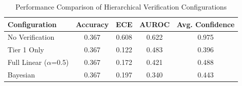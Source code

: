 \begin{table}[h]
\centering
\caption{Performance Comparison of Hierarchical Verification Configurations}
\label{tab:paper1_results}
\begin{tabular}{lcccc}
\hline
Configuration & Accuracy & ECE & AUROC & Avg. Confidence \\
\hline
No Verification & 0.367 & 0.608 & 0.622 & 0.975 \\
Tier 1 Only & 0.367 & 0.122 & 0.483 & 0.396 \\
Full Linear ($\alpha$=0.5) & 0.367 & 0.172 & 0.421 & 0.488 \\
Bayesian & 0.367 & 0.197 & 0.340 & 0.443 \\
\hline
\end{tabular}
\end{table}